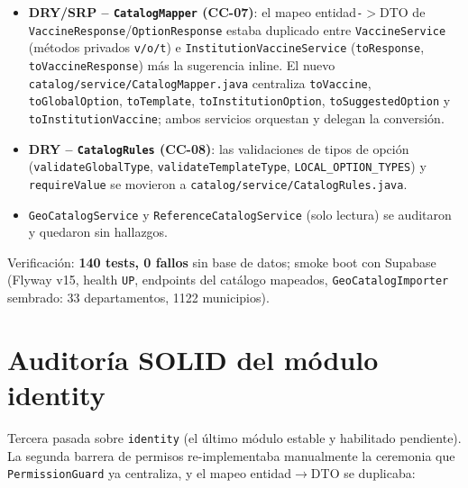 \documentclass[11pt,a4paper]{article}
\begin{document}
\begin{itemize}
  \item \textbf{DRY/SRP -- \texttt{CatalogMapper} (CC-07)}: el mapeo
        entidad\texttt{-}$>$DTO de \texttt{VaccineResponse}/\texttt{OptionResponse}
        estaba duplicado entre \texttt{VaccineService} (métodos privados
        \texttt{v/o/t}) e \texttt{InstitutionVaccineService}
        (\texttt{toResponse}, \texttt{toVaccineResponse}) más la sugerencia
        inline. El nuevo \texttt{catalog/service/CatalogMapper.java} centraliza
        \texttt{toVaccine}, \texttt{toGlobalOption}, \texttt{toTemplate},
        \texttt{toInstitutionOption}, \texttt{toSuggestedOption} y
        \texttt{toInstitutionVaccine}; ambos servicios orquestan y delegan la
        conversión.
  \item \textbf{DRY -- \texttt{CatalogRules} (CC-08)}: las validaciones de tipos
        de opción (\texttt{validateGlobalType}, \texttt{validateTemplateType},
        \texttt{LOCAL\_OPTION\_TYPES}) y \texttt{requireValue} se movieron a
        \texttt{catalog/service/CatalogRules.java}.
  \item \texttt{GeoCatalogService} y \texttt{ReferenceCatalogService} (solo
        lectura) se auditaron y quedaron sin hallazgos.
\end{itemize}

Verificación: \textbf{140 tests, 0 fallos} sin base de datos; smoke boot con
Supabase (Flyway v15, health \texttt{UP}, endpoints del catálogo mapeados,
\texttt{GeoCatalogImporter} sembrado: 33 departamentos, 1122 municipios).

\section{Auditoría SOLID del módulo identity} \label{sec:auditoria-identity}

Tercera pasada sobre \texttt{identity} (el último módulo estable y habilitado
pendiente). La segunda barrera de permisos re-implementaba manualmente la
ceremonia que \texttt{PermissionGuard} ya centraliza, y el mapeo
entidad{}${}\to{}$DTO se duplicaba:
\end{document}
